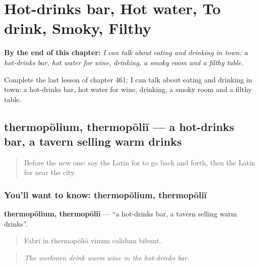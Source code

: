 
\chapter{Hot-drinks bar, Hot water, To drink, Smoky, Filthy}
\label{ch:la-hot-drinks-bar-hot-water-to-drink-smoky-filthy}

\begin{chapteropening}
\textbf{By the end of this chapter:} \emph{I can talk about eating and drinking in town: a hot-drinks bar, hot water for wine, drinking, a smoky room and a filthy table.}

Complete the last lesson of chapter 461: I can talk about eating and drinking in town: a hot-drinks bar, hot water for wine, drinking, a smoky room and a filthy table.
\end{chapteropening}

\section[thermopōlium, thermopōliī]{thermopōlium, thermopōliī — a hot-drinks bar, a tavern selling warm drinks}

\label{lesson:LA-C461-thermopolium}



\begin{quote}
Before the new one: say the Latin for to go back and forth, then the Latin for near the city.
\end{quote}

\subsection*{You'll want to know: thermopōlium, thermopōliī}
\textbf{thermopōlium, thermopōliī} — \textquotedblleft{}a hot-drinks bar, a tavern selling warm drinks\textquotedblright{}.

\begin{quote}
Fabrī in thermopōliō vīnum calidum bibunt.
\end{quote}

\begin{quote}
\emph{The workmen drink warm wine in the hot-drinks bar.}
\end{quote}

